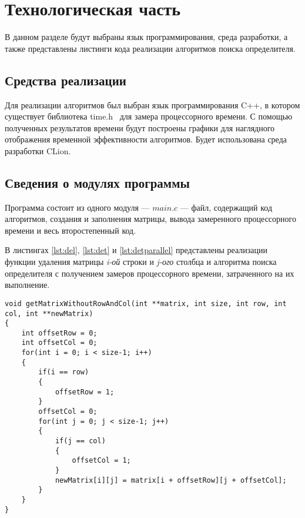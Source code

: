 \chapter{Технологическая часть}

В данном разделе будут выбраны язык программирования, среда разработки, а также представлены листинги кода реализации алгоритмов поиска определителя.

\section{Средства реализации}
Для реализации алгоритмов был выбран язык программирования C++, в котором существует библиотека time.h~\cite{time.h} для замера процессорного времени. С помощью полученных результатов времени будут построены графики для наглядного отображения временной эффективности алгоритмов. Будет использована среда разработки CLion.

\section{Сведения о модулях программы}
Программа состоит из одного модуля --- $main.c$ — файл, содержащий код алгоритмов, создания и заполнения матрицы, вывода замеренного процессорного времени и весь второстепенный код.

В листингах \ref{lst:del}, \ref{lst:det} и \ref{lst:detparallel} представлены реализации функции удаления матрицы \textit{i}\textit{-ой} строки и \textit{j}\textit{-ого} столбца и алгоритма поиска определителя с получением замеров процессорного времени, затраченного на их выполнение.

\begin{center}
    \captionsetup{justification=raggedright,singlelinecheck=off}
    \begin{lstlisting}[label=lst:del,caption=Функция удаления \textit{i}\textit{-ой} строки и \textit{j}\textit{-ого} столбца]
void getMatrixWithoutRowAndCol(int **matrix, int size, int row, int col, int **newMatrix)
{
    int offsetRow = 0;
    int offsetCol = 0;
    for(int i = 0; i < size-1; i++)
	{
        if(i == row)
		{
            offsetRow = 1;
        }
        offsetCol = 0;
        for(int j = 0; j < size-1; j++)
		{
            if(j == col)
			{
                offsetCol = 1;
            }
            newMatrix[i][j] = matrix[i + offsetRow][j + offsetCol];
        }
    }
}
\end{lstlisting}
\end{center}

